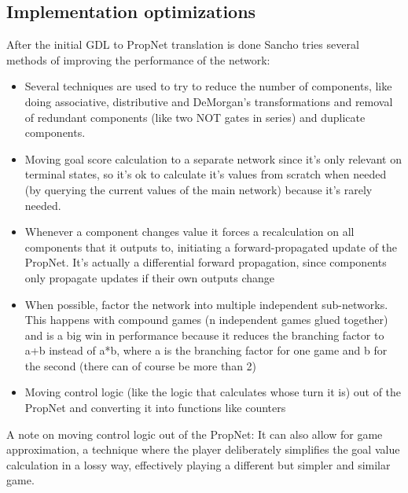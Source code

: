 \subsection{Implementation optimizations}
After the initial GDL to PropNet translation is done Sancho tries several methods of improving the performance of the network:
\begin{itemize}
	\item Several techniques are used to try to reduce the number of components, like doing associative, distributive and DeMorgan's transformations and removal of redundant components (like two NOT gates in series) and duplicate components.
	
	\item Moving goal score calculation to a separate network since it's only relevant on terminal states, so it's ok to calculate it's values from scratch when needed (by querying the current values of the main network) because it's rarely needed.
	
	\item Whenever a component changes value it forces a recalculation on all components that it outputs to,  initiating a forward-propagated update of the PropNet.
	It's actually a differential forward propagation, since components only propagate updates if their own outputs change
	
	\item When possible, factor the network into multiple independent sub-networks. This happens with compound games (n independent games glued together) and is a big win in performance because it reduces the branching factor to a+b instead of a*b, where a is the branching factor for one game and b for the second (there can of course be more than 2)
	
	\item Moving control logic (like the logic that calculates whose turn it is) out of the PropNet and converting it into functions like counters
	
\end{itemize}

A note on moving control logic out of the PropNet: It can also allow for game approximation, a technique where the player deliberately simplifies the goal value calculation in a lossy way, effectively playing a different but simpler and similar game.

